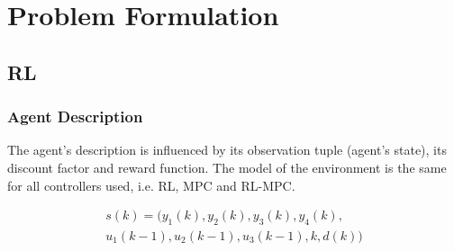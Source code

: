 \section{Problem Formulation}

\subsection{RL}


\subsubsection{Agent Description}
The agent's description is influenced by its observation tuple (agent's state), its discount factor and reward function. The model of the environment is the same for all controllers used, i.e. RL, MPC and RL-MPC.

\begin{multline}\label{eq:obs-tuple}
	s(k) = (y_1(k),y_2(k),y_3(k),y_4(k), \\u_1(k-1), u_2(k-1), u_3(k-1), k, d(k))
\end{multline}



